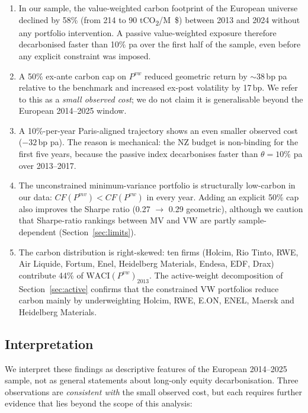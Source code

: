 \documentclass[11pt,a4paper]{article}
\begin{document}
\begin{enumerate}[leftmargin=*]
  \item In our sample, the value-weighted carbon footprint of the
        European universe declined by 58\% (from 214 to 90
        \si{tCO_2/M\$}) between 2013 and 2024 without any portfolio
        intervention. A passive value-weighted exposure therefore
        decarbonised faster than 10\% pa over the first half of the
        sample, even before any explicit constraint was imposed.
  \item A 50\% ex-ante carbon cap on $P^{vw}$ reduced geometric return
        by $\sim$38\,bp pa relative to the benchmark and increased
        ex-post volatility by 17\,bp. We refer to this as a
        \emph{small observed cost}; we do not claim it is generalisable
        beyond the European 2014--2025 window.
  \item A 10\%-per-year Paris-aligned trajectory shows an even smaller
        observed cost ($-32$\,bp pa). The reason is mechanical: the NZ
        budget is non-binding for the first five years, because the
        passive index decarbonises faster than $\theta=10\%$ pa over
        2013--2017.
  \item The unconstrained minimum-variance portfolio is structurally
        low-carbon in our data: $CF(P^{mv}) < CF(P^{vw})$ in every
        year. Adding an explicit 50\% cap also improves the Sharpe
        ratio (0.27 $\to$ 0.29 geometric), although we caution that
        Sharpe-ratio rankings between MV and VW are partly
        sample-dependent (Section~\ref{sec:limits}).
  \item The carbon distribution is right-skewed: ten firms (Holcim,
        Rio Tinto, RWE, Air Liquide, Fortum, Enel, Heidelberg
        Materials, Endesa, EDF, Drax) contribute 44\% of
        $\text{WACI}(P^{vw})_{2013}$. The active-weight decomposition
        of Section~\ref{sec:active} confirms that the constrained
        VW portfolios reduce carbon mainly by underweighting
        Holcim, RWE, E.ON, ENEL, Maersk and Heidelberg Materials.
\end{enumerate}

\subsection{Interpretation}

We interpret these findings as descriptive features of the European
2014--2025 sample, not as general statements about long-only equity
decarbonisation. Three observations are \emph{consistent with} the
small observed cost, but each requires further evidence that lies
beyond the scope of this analysis:
\end{document}
